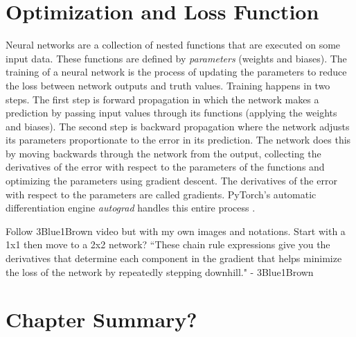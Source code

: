 \section{Optimization and Loss Function}
Neural networks are a collection of nested functions that are executed on some input data. These functions are defined by \emph{parameters} (weights and biases). The training of a neural network is the process of updating the parameters to reduce the loss between network outputs and truth values. Training happens in two steps. The first step is forward propagation in which the network makes a prediction by passing input values through its functions (applying the weights and biases). The second step is backward propagation where the network adjusts its parameters proportionate to the error in its prediction. The network does this by moving backwards through the network from the output, collecting the derivatives of the error with respect to the parameters of the functions and optimizing the parameters using gradient descent. The derivatives of the error with respect to the parameters are called gradients. PyTorch's automatic differentiation engine \textit{autograd} handles this entire process \cite{NEURIPS2019_9015}.

Follow 3Blue1Brown video but with my own images and notations. Start with a 1x1 then move to a 2x2 network?
``These chain rule expressions give you the derivatives that determine each component in the gradient that helps minimize the loss of the network by repeatedly stepping downhill." - 3Blue1Brown

\section{Chapter Summary?}
